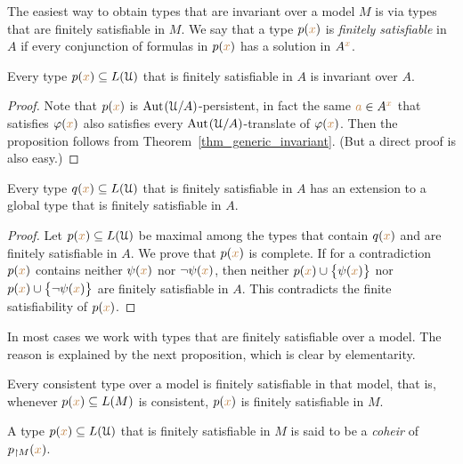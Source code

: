 The easiest way to obtain types that are invariant over a model $M$ is via types that are finitely satisfiable in $M$.
We say that a type $p({\color{brown} x})$ is \emph{finitely satisfiable\/} in $A$ if every conjunction of formulas in $p({\color{brown} x})$ has a solution in $A^{\color{brown} x}$.

\begin{proposition}\label{prop_coeredi_quasiinvarienti}
  Every type $p({\color{brown} x})\subseteq L(\EuScript U)$ that is finitely satisfiable in $A$ is invariant over $A$.
\end{proposition}

\begin{proof}
  Note that $p({\color{brown} x})$ is ${\rm Aut\kern.15ex}(\EuScript U/A)$-persistent, in fact the same ${\color{brown} a}\in A^{\color{brown} x}$ that satisfies $\varphi({\color{brown} x})$ also satisfies every ${\rm Aut\kern.15ex}(\EuScript U/A)$-translate of $\varphi({\color{brown} x})$.
  Then the proposition follows from Theorem~\ref{thm_generic_invariant}.
  (But a direct proof is also easy.)  
\end{proof}

\begin{proposition}\label{prop_exisntence_coheirs}
  Every type $q({\color{brown} x})\subseteq L(\EuScript U)$ that is finitely satisfiable in $A$ has an extension to a global type that is finitely satisfiable in $A$.
\end{proposition}

\begin{proof} 
  Let $p({\color{brown} x})\subseteq L(\EuScript U)$ be maximal among the types that contain $q({\color{brown} x})$ and are finitely satisfiable in $A$.
  We prove that $p({\color{brown} x})$ is complete.
  If for a contradiction $p({\color{brown} x})$ contains neither $\psi({\color{brown} x})$ nor $\neg\psi({\color{brown} x})$, then  neither $p({\color{brown} x})\cup\big\{\psi({\color{brown} x})\big\}$ nor $p({\color{brown} x})\cup\big\{\neg\psi({\color{brown} x})\big\}$ are finitely satisfiable in $A$.
  This contradicts the finite satisfiability of $p({\color{brown} x})$.
\end{proof}

In most cases we work with types that are finitely satisfiable over a model.
The reason is explained by the next proposition, which is clear by elementarity.

\begin{proposition}\label{prop_coher_over_model}
  Every consistent type over a model is finitely satisfiable in that model, that is, whenever $p({\color{brown} x})\subseteq L(M)$ is consistent, $p({\color{brown} x})$ is finitely satisfiable in $M$.
\end{proposition}

\begin{definition}\label{def_choeir_uno} A type $p({\color{brown} x}) \subseteq L(\EuScript U)$ that is finitely satisfiable in $M$ is said to be a \emph{coheir\/} of $p_{\restriction M}({\color{brown} x})$.
\end{definition}

